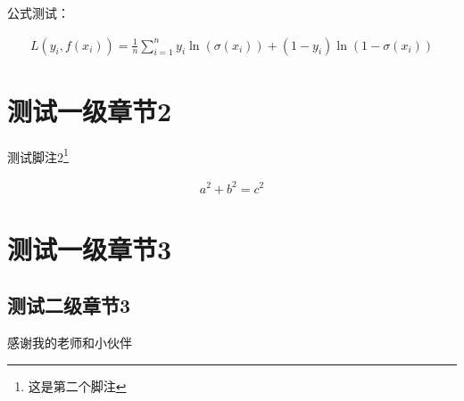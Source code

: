 \documentclass{SUIBEthesis}
\begin{document}
公式测试：

\begin{eqnarray}
L(y_i, f(x_i)) = \frac{1}{n}\sum_{i=1}^n y_i \ln (\sigma(x_i)) + (1-y_i)\ln (1-\sigma(x_i))
\end{eqnarray}



\section{测试一级章节2}
测试脚注2\footnote{这是第二个脚注}

\begin{eqnarray}
a^2 + b^2 = c^2
\end{eqnarray}

\section{测试一级章节3}

\subsection{测试二级章节3}

\xiaosi


\newpage
\begin{mythanks}
感谢我的老师和小伙伴
\end{mythanks}
\end{document}
